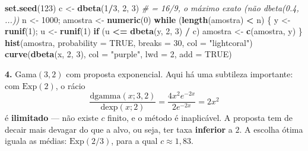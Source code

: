 \documentclass[
  portuguese,
  11pt,
  openany]{book}
\newenvironment{Shaded}{\begin{snugshade}}{\end{snugshade}}
\newcommand{\AttributeTok}[1]{\textcolor[rgb]{0.13,0.29,0.53}{#1}}
\newcommand{\CommentTok}[1]{\textcolor[rgb]{0.56,0.35,0.01}{\textit{#1}}}
\newcommand{\ConstantTok}[1]{\textcolor[rgb]{0.56,0.35,0.01}{#1}}
\newcommand{\ControlFlowTok}[1]{\textcolor[rgb]{0.13,0.29,0.53}{\textbf{#1}}}
\newcommand{\DecValTok}[1]{\textcolor[rgb]{0.00,0.00,0.81}{#1}}
\newcommand{\FunctionTok}[1]{\textcolor[rgb]{0.13,0.29,0.53}{\textbf{#1}}}
\newcommand{\NormalTok}[1]{#1}
\newcommand{\OtherTok}[1]{\textcolor[rgb]{0.56,0.35,0.01}{#1}}
\newcommand{\SpecialCharTok}[1]{\textcolor[rgb]{0.81,0.36,0.00}{\textbf{#1}}}
\newcommand{\StringTok}[1]{\textcolor[rgb]{0.31,0.60,0.02}{#1}}
\begin{document}
\begin{Shaded}
\begin{Highlighting}[]
\FunctionTok{set.seed}\NormalTok{(}\DecValTok{123}\NormalTok{)}
\NormalTok{c }\OtherTok{\textless{}{-}} \FunctionTok{dbeta}\NormalTok{(}\DecValTok{1}\SpecialCharTok{/}\DecValTok{3}\NormalTok{, }\DecValTok{2}\NormalTok{, }\DecValTok{3}\NormalTok{)          }\CommentTok{\# = 16/9, o máximo exato (não dbeta(0.4, ...))}
\NormalTok{n }\OtherTok{\textless{}{-}} \DecValTok{1000}\NormalTok{; amostra }\OtherTok{\textless{}{-}} \FunctionTok{numeric}\NormalTok{(}\DecValTok{0}\NormalTok{)}
\ControlFlowTok{while}\NormalTok{ (}\FunctionTok{length}\NormalTok{(amostra) }\SpecialCharTok{\textless{}}\NormalTok{ n) \{}
\NormalTok{  y }\OtherTok{\textless{}{-}} \FunctionTok{runif}\NormalTok{(}\DecValTok{1}\NormalTok{); u }\OtherTok{\textless{}{-}} \FunctionTok{runif}\NormalTok{(}\DecValTok{1}\NormalTok{)}
  \ControlFlowTok{if}\NormalTok{ (u }\SpecialCharTok{\textless{}=} \FunctionTok{dbeta}\NormalTok{(y, }\DecValTok{2}\NormalTok{, }\DecValTok{3}\NormalTok{) }\SpecialCharTok{/}\NormalTok{ c) amostra }\OtherTok{\textless{}{-}} \FunctionTok{c}\NormalTok{(amostra, y)}
\NormalTok{\}}
\FunctionTok{hist}\NormalTok{(amostra, }\AttributeTok{probability =} \ConstantTok{TRUE}\NormalTok{, }\AttributeTok{breaks =} \DecValTok{30}\NormalTok{, }\AttributeTok{col =} \StringTok{"lightcoral"}\NormalTok{)}
\FunctionTok{curve}\NormalTok{(}\FunctionTok{dbeta}\NormalTok{(x, }\DecValTok{2}\NormalTok{, }\DecValTok{3}\NormalTok{), }\AttributeTok{col =} \StringTok{"purple"}\NormalTok{, }\AttributeTok{lwd =} \DecValTok{2}\NormalTok{, }\AttributeTok{add =} \ConstantTok{TRUE}\NormalTok{)}
\end{Highlighting}
\end{Shaded}

\textbf{4.} Gama\((3, 2)\) com proposta exponencial. Aqui há uma subtileza importante:
com \(\text{Exp}(2)\), o rácio
\[\frac{\text{dgamma}(x;3,2)}{\text{dexp}(x;2)} = \frac{4x^2 e^{-2x}}{2e^{-2x}} = 2x^2\]
é \textbf{ilimitado} --- não existe \(c\) finito, e o método é inaplicável. A proposta
tem de decair mais devagar do que a alvo, ou seja, ter taxa \textbf{inferior} a \(2\). A
escolha ótima iguala as médias: \(\text{Exp}(2/3)\), para a qual \(c \approx 1{,}83\).
\end{document}
